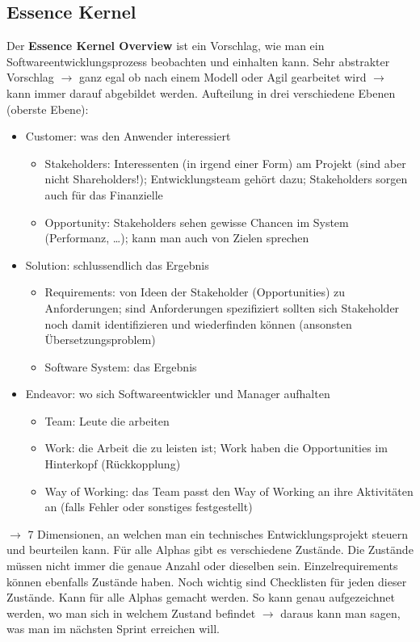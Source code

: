 \documentclass[a4paper,12pt,twoside]{scrreprt}
\begin{document}
\subsection{Essence Kernel}
Der \textbf{Essence Kernel Overview} ist ein Vorschlag, wie man ein Softwareentwicklungsprozess beobachten und einhalten kann. 
Sehr abstrakter Vorschlag $\rightarrow$ ganz egal ob nach einem Modell oder Agil gearbeitet wird $\rightarrow$ kann immer darauf abgebildet werden.
\newline
Aufteilung in drei verschiedene Ebenen (oberste Ebene):
\begin{itemize}
  \item{Customer: was den Anwender interessiert}
    \begin{itemize}
      \item{Stakeholders: Interessenten (in irgend einer Form) am Projekt (sind aber nicht Shareholders!); Entwicklungsteam gehört dazu; Stakeholders sorgen auch für das Finanzielle} 
      \item{Opportunity: Stakeholders sehen gewisse Chancen im System (Performanz, …); kann man auch von Zielen sprechen}
    \end{itemize}
  \item{Solution: schlussendlich das Ergebnis}
  \begin{itemize}
    \item{Requirements: von Ideen der Stakeholder (Opportunities) zu Anforderungen; sind Anforderungen spezifiziert sollten sich Stakeholder noch damit identifizieren und wiederfinden können (ansonsten Übersetzungsproblem)} 
    \item{Software System: das Ergebnis}
  \end{itemize}
  \item{Endeavor: wo sich Softwareentwickler und Manager aufhalten}
  \begin{itemize}
    \item{Team: Leute die arbeiten} 
    \item{Work: die Arbeit die zu leisten ist; Work haben die Opportunities im Hinterkopf (Rückkopplung)}
    \item{Way of Working: das Team passt den Way of Working an ihre Aktivitäten an (falls Fehler oder sonstiges festgestellt)}
  \end{itemize}
\end{itemize}

$\rightarrow$ 7 Dimensionen, an welchen man ein technisches Entwicklungsprojekt steuern und beurteilen kann. \newline
Für alle Alphas gibt es verschiedene Zustände. Die Zustände müssen nicht immer die genaue Anzahl oder dieselben sein.
Einzelrequirements können ebenfalls Zustände haben. Noch wichtig sind Checklisten für jeden dieser Zustände. Kann für alle Alphas gemacht werden.
So kann genau aufgezeichnet werden, wo man sich in welchem Zustand befindet $\rightarrow$ daraus kann man sagen, was man im nächsten Sprint erreichen will.
\end{document}
